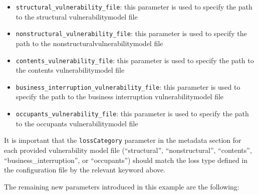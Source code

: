 \begin{itemize}

  \item \Verb+structural_vulnerability_file+: this parameter is used to
    specify the path to the structural \gls{vulnerabilitymodel} file

  \item \Verb+nonstructural_vulnerability_file+: this parameter is used to
    specify the path to the nonstructural\gls{vulnerabilitymodel} file

  \item \Verb+contents_vulnerability_file+: this parameter is used to
    specify the path to the contents \gls{vulnerabilitymodel} file

  \item \Verb+business_interruption_vulnerability_file+: this parameter is
    used to specify the path to the business interruption
    \gls{vulnerabilitymodel} file

  \item \Verb+occupants_vulnerability_file+: this parameter is used to
    specify the path to the occupants \gls{vulnerabilitymodel} file

\end{itemize}

It is important that the \Verb+lossCategory+ parameter in the metadata section
for each provided vulnerability model file (``structural'', ``nonstructural'',
``contents'', ``business\_interruption'', or ``occupants'') should match the
loss type defined in the configuration file by the relevant keyword above.

The remaining new parameters introduced in this example are the following:


